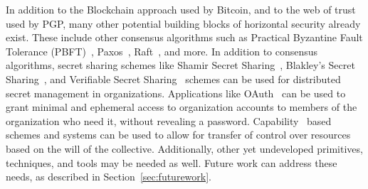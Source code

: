 
In addition to the Blockchain approach used by Bitcoin, and to the web of trust
used by PGP, many other potential building blocks of horizontal security already
exist. These include other consensus algorithms such as Practical Byzantine
Fault Tolerance (PBFT)~\cite{castro1999practical}, Paxos~\cite{lamport2019part}, 
Raft~\cite{ongaro2013search}, and more. In addition to consensus algorithms,
secret sharing schemes like Shamir Secret Sharing~\cite{shamir1979share}, 
Blakley's Secret Sharing~\cite{blakley1993linear}, and Verifiable Secret 
Sharing~\cite{chor1985verifiable} schemes can be used for distributed secret
management in organizations. Applications like OAuth~\cite{leiba2012oauth} can
be used to grant minimal and ephemeral access to organization accounts to
members of the organization who need it, without revealing a password. 
Capability~\cite{dennis1966programming} based schemes and systems can be used to
allow for transfer of control over resources based on the will of the
collective. Additionally, other yet undeveloped primitives, techniques, and
tools may be needed as well. Future work can address these needs, as described
in Section~\ref{sec:futurework}.






